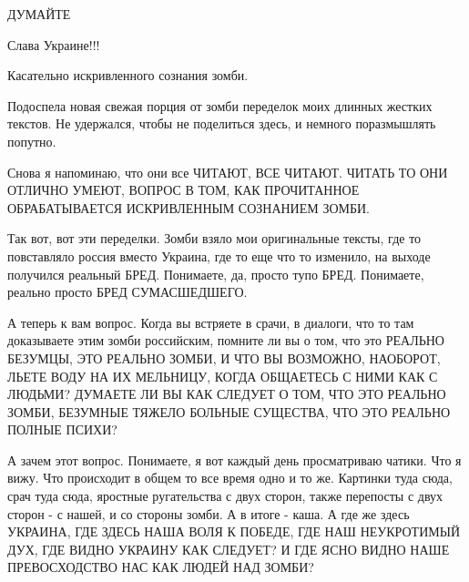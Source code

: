  
 
 
 
 

ДУМАЙТЕ

Слава Украине!!! 💛 💙 💛 💙 💛 💙 💛 💙 💛 💙 💛 💙 💛 💛 💙 💛 💙 💛 💙 💛 💙 💛 💙 💛 💙 💛 💙                           

Касательно искривленного сознания зомби.

Подоспела новая свежая порция от зомби переделок моих длинных жестких текстов.
Не удержался, чтобы не поделиться здесь, и немного поразмышлять попутно. 

Снова я напоминаю, что они все ЧИТАЮТ, ВСЕ ЧИТАЮТ. ЧИТАТЬ ТО ОНИ ОТЛИЧНО УМЕЮТ,
ВОПРОС В ТОМ, КАК ПРОЧИТАННОЕ ОБРАБАТЫВАЕТСЯ ИСКРИВЛЕННЫМ СОЗНАНИЕМ ЗОМБИ.

Так вот, вот эти переделки. Зомби взяло мои оригинальные тексты, где то
повставляло россия вместо Украина, где то еще что то изменило, на выходе
получился реальный БРЕД. Понимаете, да, просто тупо БРЕД. Понимаете, реально
просто БРЕД СУМАСШЕДШЕГО.

А теперь к вам вопрос. Когда вы встряете в срачи, в диалоги, что то там
доказываете этим зомби российским, помните ли вы о том, что это РЕАЛЬНО
БЕЗУМЦЫ, ЭТО РЕАЛЬНО ЗОМБИ, И ЧТО ВЫ ВОЗМОЖНО, НАОБОРОТ, ЛЬЕТЕ ВОДУ НА ИХ
МЕЛЬНИЦУ, КОГДА ОБЩАЕТЕСЬ С НИМИ КАК С ЛЮДЬМИ? ДУМАЕТЕ ЛИ ВЫ КАК СЛЕДУЕТ О ТОМ,
ЧТО ЭТО РЕАЛЬНО ЗОМБИ, БЕЗУМНЫЕ ТЯЖЕЛО БОЛЬНЫЕ СУЩЕСТВА, ЧТО ЭТО РЕАЛЬНО ПОЛНЫЕ
ПСИХИ? 

А зачем этот вопрос. Понимаете, я вот каждый день просматриваю чатики. Что я
вижу. Что происходит в общем то все время одно и то же. Картинки туда сюда,
срач туда сюда, яростные ругательства с двух сторон, также перепосты с двух
сторон - с нашей, и со стороны зомби. А в итоге - каша.  А где же здесь
УКРАИНА, ГДЕ ЗДЕСЬ НАША ВОЛЯ К ПОБЕДЕ, ГДЕ НАШ НЕУКРОТИМЫЙ ДУХ, ГДЕ ВИДНО
УКРАИНУ КАК СЛЕДУЕТ? И ГДЕ ЯСНО ВИДНО НАШЕ ПРЕВОСХОДСТВО НАС КАК ЛЮДЕЙ НАД
ЗОМБИ?

